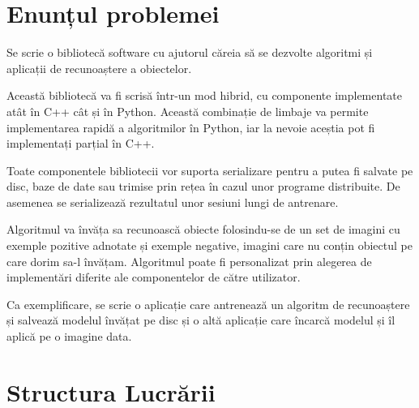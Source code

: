













\section{Enunțul problemei}
Se scrie o bibliotecă software cu ajutorul căreia să se dezvolte algoritmi și aplicații de recunoaștere a obiectelor.

Această bibliotecă va fi scrisă într-un mod hibrid, cu componente implementate atât în C++ cât și în Python.
Această combinație de limbaje va permite implementarea rapidă a algoritmilor în Python, iar la nevoie aceștia pot fi implementați parțial în C++.

Toate componentele bibliotecii vor suporta serializare pentru a putea fi salvate pe disc, baze de date sau trimise prin rețea în cazul unor programe distribuite.
De asemenea se serializează rezultatul unor sesiuni lungi de antrenare.

Algoritmul va învăța sa recunoască obiecte folosindu-se de un set de imagini cu exemple pozitive adnotate și exemple negative, imagini care nu conțin obiectul pe care dorim sa-l învățam.
Algoritmul poate fi personalizat prin alegerea de implementări diferite ale componentelor de către utilizator.

Ca exemplificare, se scrie o aplicație care antrenează un algoritm de recunoaștere și salvează modelul învățat pe disc și o altă aplicație care încarcă modelul și îl aplică pe o imagine data.



\section{Structura Lucrării}


